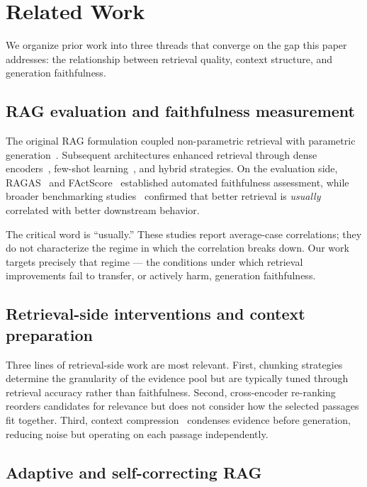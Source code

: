 \section{Related Work}
\label{sec:related}

We organize prior work into three threads that converge on the gap this paper
addresses: the relationship between retrieval quality, context structure, and
generation faithfulness.

\subsection{RAG evaluation and faithfulness measurement}

The original RAG formulation coupled non-parametric retrieval with parametric
generation~\citep{lewis2020rag}. Subsequent architectures enhanced retrieval
through dense encoders~\citep{karpukhin2020dpr}, few-shot
learning~\citep{izacard2022atlas}, and hybrid strategies. On the evaluation
side, RAGAS~\citep{es2024ragas} and FActScore~\citep{min2023factscore}
established automated faithfulness assessment, while broader benchmarking
studies~\citep{chen2024benchmarking, gao2024retrievalaugmented} confirmed
that better retrieval is \emph{usually} correlated with better downstream
behavior.

The critical word is ``usually.'' These studies report average-case
correlations; they do not characterize the regime in which the
correlation breaks down. Our work targets precisely that regime — the
conditions under which retrieval improvements fail to transfer, or
actively harm, generation faithfulness.

\subsection{Retrieval-side interventions and context preparation}

Three lines of retrieval-side work are most relevant. First, chunking
strategies~\citep{kamradt2024chunking} determine the granularity of the
evidence pool but are typically tuned through retrieval accuracy rather than
faithfulness. Second, cross-encoder re-ranking~\citep{nogueira2019passage,
glass2022re2g} reorders candidates for relevance but does not consider how
the selected passages fit together. Third, context
compression~\citep{xu2023recomp} condenses evidence before generation,
reducing noise but operating on each passage independently.

\subsection{Adaptive and self-correcting RAG}

